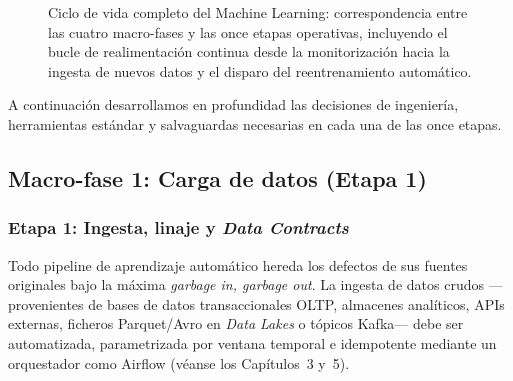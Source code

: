 \begin{figure}[htbp]
{%
}
\caption{Ciclo de vida completo del Machine Learning: correspondencia entre las cuatro macro-fases y las once etapas operativas, incluyendo el bucle de realimentación continua desde la monitorización hacia la ingesta de nuevos datos y el disparo del reentrenamiento automático.}
\label{fig:mlops-ciclo-11-etapas}
\end{figure}

A continuación desarrollamos en profundidad las decisiones de ingeniería, herramientas estándar y salvaguardas necesarias en cada una de las once etapas.

\subsection{Macro-fase 1: Carga de datos (Etapa 1)}

\subsubsection{Etapa 1: Ingesta, linaje y \textit{Data Contracts}}

Todo pipeline de aprendizaje automático hereda los defectos de sus fuentes originales bajo la máxima \textit{garbage in, garbage out}. La ingesta de datos crudos ---provenientes de bases de datos transaccionales OLTP, almacenes analíticos, APIs externas, ficheros Parquet/Avro en \textit{Data Lakes} o tópicos Kafka--- debe ser automatizada, parametrizada por ventana temporal e idempotente mediante un orquestador como Airflow (véanse los Capítulos~3 y~5).

